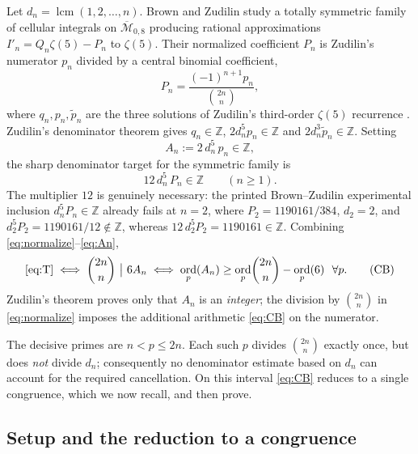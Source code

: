 \documentclass[11pt]{article}
\theoremstyle{definition}
\DeclareMathOperator{\ord}{ord}
\DeclareMathOperator{\lcm}{lcm}
\newcommand{\Z}{\mathbb{Z}}
\newcommand{\zt}[1]{\zeta(#1)}
\newcommand{\bin}[2]{\binom{#1}{#2}}
\begin{document}
Let $d_n=\lcm(1,2,\dots,n)$. Brown and Zudilin \cite{BZ} study a totally
symmetric family of cellular integrals on $\overline{\mathcal M}_{0,8}$ producing
rational approximations $I'_n=Q_n\zt5-P_n$ to $\zeta(5)$. Their normalized
coefficient $P_n$ is Zudilin's numerator $p_n$ divided by a central binomial
coefficient,
\begin{equation}\label{eq:normalize}
P_n=\frac{(-1)^{n+1}p_n}{\bin{2n}{n}},
\end{equation}
where $q_n,p_n,\widetilde p_n$ are the three solutions of Zudilin's third-order
$\zeta(5)$ recurrence \cite{Zud178}. Zudilin's denominator theorem gives
$q_n\in\Z$, $2d_n^5 p_n\in\Z$ and $2d_n^3\widetilde p_n\in\Z$. Setting
\begin{equation}\label{eq:An}
A_n:=2\,d_n^5\,p_n\in\Z,
\end{equation}
the sharp denominator target for the symmetric family is
\begin{equation}\label{eq:T}
12\,d_n^5\,P_n\in\Z\qquad(n\ge1).\tag{T}
\end{equation}
The multiplier $12$ is genuinely necessary: the printed Brown--Zudilin
experimental inclusion $d_n^5P_n\in\Z$ already fails at $n=2$, where
$P_2=1190161/384$, $d_2=2$, and $d_2^5P_2=1190161/12\notin\Z$, whereas
$12\,d_2^5P_2=1190161\in\Z$. Combining \eqref{eq:normalize}--\eqref{eq:An},
\begin{equation}\label{eq:CB}
\text{\eqref{eq:T}}\iff \bin{2n}{n}\ \big|\ 6A_n
\iff \ord_p(A_n)\ge \ord_p\!\bin{2n}{n}-\ord_p(6)\ \ \forall p.\tag{CB}
\end{equation}
Zudilin's theorem proves only that $A_n$ is an \emph{integer}; the division by
$\bin{2n}{n}$ in \eqref{eq:normalize} imposes the additional arithmetic
\eqref{eq:CB} on the numerator.

The decisive primes are $n<p\le 2n$. Each such $p$ divides $\bin{2n}{n}$ exactly
once, but does \emph{not} divide $d_n$; consequently no denominator estimate
based on $d_n$ can account for the required cancellation. On this interval
\eqref{eq:CB} reduces to a single congruence, which we now recall, and then prove.

\subsection*{Setup and the reduction to a congruence}
\end{document}
